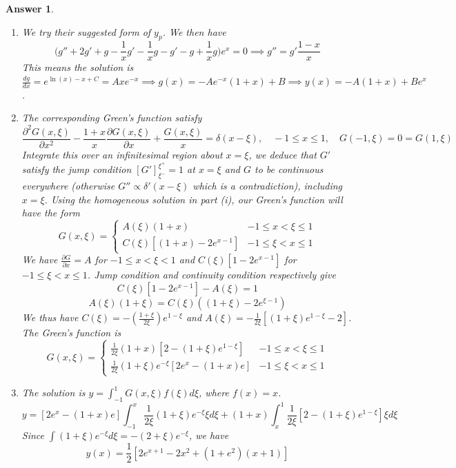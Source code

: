 \documentclass[a4paper]{article}
\newtheorem{ans}{Answer}[section]
\theoremstyle{new}
\begin{document}
\begin{ans}\leavevmode
\begin{enumerate}[label=(\roman*)]
\item We try their suggested form of $y_p$. We then have
$$\bigg(g''+2g'+g-\frac{1}{x}g'-\frac{1}{x}g-g'-g+\frac{1}{x}g\bigg)e^x=0\implies g''=g'\frac{1-x}{x}$$
This means the solution is $\frac{dg}{dx}=e^{\ln(x)-x+C}=Axe^{-x}\implies g(x)=-Ae^{-x}(1+x)+B\implies y(x)=-A(1+x)+Be^x$.
\item The corresponding Green's function satisfy 
$$\frac{\partial^2G(x,\xi)}{\partial x^2}-\frac{1+x}{x}\frac{\partial G(x,\xi)}{\partial x}+\frac{G(x,\xi)}{x}=\delta(x-\xi),\quad -1\leq x\leq 1,\quad G(-1,\xi)=0=G(1,\xi)$$
Integrate this over an infinitesimal region about $x=\xi$, we deduce that $G'$ satisfy the jump condition $[G']_{\xi^-}^{\xi^+}=1$ at $x=\xi$ and $G$ to be continuous everywhere (otherwise $G''\propto\delta'(x-\xi)$ which is a contradiction), including $x=\xi$. Using the homogeneous solution in part (i), our Green's function will have the form
$$G(x,\xi)=
\left\{
        \begin{array}{ll}
      A(\xi)(1+x)& -1\leq x<\xi\leq1 \\
      C(\xi)[(1+x)-2e^{x-1}]& -1\leq\xi<x\leq 1
        \end{array}
    \right.$$
We have $\frac{\partial G}{\partial x}=A$ for $-1\leq x<\xi<1$ and $C(\xi)[1-2e^{x-1}]$ for $-1\leq\xi<x\leq1$. Jump condition and continuity condition respectively give $$C(\xi)[1-2e^{x-1}]-A(\xi)=1$$ $$A(\xi)(1+\xi)=C(\xi)((1+\xi)-2e^{\xi-1})$$
We thus have $C(\xi)=-(\frac{1+\xi}{2\xi})e^{1-\xi}$ and $A(\xi)=-\frac{1}{2\xi}[(1+\xi)e^{1-\xi}-2]$. The Green's function is
$$G(x,\xi)=
\left\{
        \begin{array}{ll}
      \frac{1}{2\xi}(1+x)[2-(1+\xi)e^{1-\xi}]& -1\leq x<\xi\leq1 \\
      \frac{1}{2\xi}(1+\xi)e^{-\xi}[2e^x-(1+x)e] & -1\leq\xi<x\leq 1
        \end{array}
    \right.$$
\item The solution is $y=\int_{-1}^1G(x,\xi)f(\xi)d\xi$, where $f(x)=x$.
$$y=[2e^x-(1+x)e]\int_{-1}^x\frac{1}{2\xi}(1+\xi)e^{-\xi}\xi d\xi+(1+x)\int_x^1\frac{1}{2\xi}[2-(1+\xi)e^{1-\xi}]\xi d\xi$$
Since $\int(1+\xi)e^{-\xi}d\xi=-(2+\xi)e^{-\xi}$, we have
$$y(x)=\frac{1}{2}[2e^{x+1}-2x^2+(1+e^2)(x+1)]$$
\end{enumerate}
\end{ans}
\newpage
\end{document}
